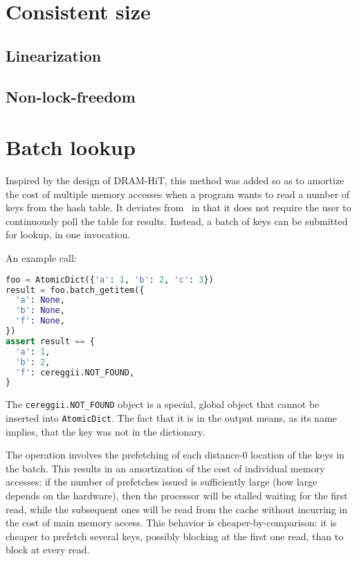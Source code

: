 \section{Consistent size}\label{sec:consistent-size}

\subsection{Linearization}
\subsection{Non-lock-freedom}

\section{Batch lookup}\label{sec:batch-lookup}

Inspired by the design of DRAM-HiT, this method was added so as to amortize the cost of multiple memory accesses when a program wants to read a number of keys from the hash table.
It deviates from~\cite{dramhit} in that it does not require the user to continuously poll the table for results.
Instead, a batch of keys can be submitted for lookup, in one invocation.

An example call:

\begin{lstlisting}[language=Python]
foo = AtomicDict({'a': 1, 'b': 2, 'c': 3})
result = foo.batch_getitem({
  'a': None,
  'b': None,
  'f': None,
})
assert result == {
  'a': 1,
  'b': 2,
  'f': cereggii.NOT_FOUND,
}
\end{lstlisting}

The \texttt{cereggii.NOT\_FOUND} object is a special, global object that cannot be inserted into \texttt{AtomicDict}.
The fact that it is in the output means, as its name implies, that the key was not in the dictionary.

The operation involves the prefetching of each distance-0 location of the keys in the batch.
This results in an amortization of the cost of individual memory accesses: if the number of prefetches issued is sufficiently large (how large depends on the hardware), then the processor will be stalled waiting for the first read, while the subsequent ones will be read from the cache without incurring in the cost of main memory access.
This behavior is cheaper-by-comparison: it is cheaper to prefetch several keys, possibly blocking at the first one read, than to block at every read.

